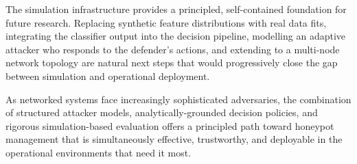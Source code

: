 The simulation infrastructure provides a principled, self-contained
foundation for future research.
Replacing synthetic feature distributions with real data fits, integrating
the classifier output into the decision pipeline, modelling an adaptive
attacker who responds to the defender's actions, and extending to a multi-node
network topology are natural next steps that would progressively close the gap
between simulation and operational deployment.

As networked systems face increasingly sophisticated adversaries, the
combination of structured attacker models, analytically-grounded decision
policies, and rigorous simulation-based evaluation offers a principled path
toward honeypot management that is simultaneously effective, trustworthy,
and deployable in the operational environments that need it most.

